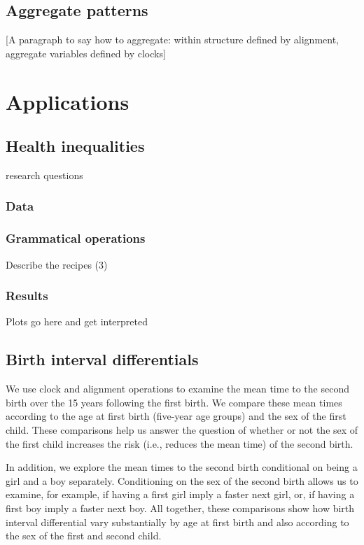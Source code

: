 \documentclass{article}
\begin{document}
\subsection{Aggregate patterns}

[A paragraph to say how to aggregate: within structure defined by alignment, aggregate variables defined by clocks]


\section{Applications}

\subsection{Health inequalities}
research questions
\subsubsection{Data}

\subsubsection{Grammatical operations}
Describe the recipes (3)

\subsubsection{Results}
Plots go here and get interpreted

\subsection{Birth interval differentials}

 We use clock and alignment operations to examine the mean time to the second birth over the 15 years following the first birth. We compare these mean times according to the age at first birth (five-year age groups) and the sex of the first child. These comparisons help us answer the question of whether or not the sex of the first child increases the risk (i.e., reduces the mean time) of the second birth. 
 
 In addition, we explore the mean times to the second birth conditional on being a girl and a boy separately. Conditioning on the sex of the second birth allows us to examine, for example, if having a first girl imply a faster next girl, or, if having a first boy imply a faster next boy. All together, these comparisons show how birth interval differential vary substantially by age at first birth and also according to the sex of the first and second child.
 
\end{document}
